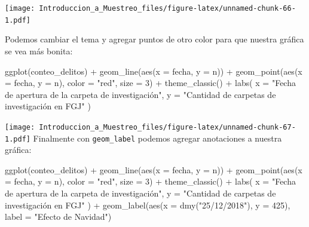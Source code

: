 \documentclass[
]{book}
\newenvironment{Shaded}{\begin{snugshade}}{\end{snugshade}}
\newcommand{\AttributeTok}[1]{\textcolor[rgb]{0.77,0.63,0.00}{#1}}
\newcommand{\DecValTok}[1]{\textcolor[rgb]{0.00,0.00,0.81}{#1}}
\newcommand{\FunctionTok}[1]{\textcolor[rgb]{0.00,0.00,0.00}{#1}}
\newcommand{\NormalTok}[1]{#1}
\newcommand{\SpecialCharTok}[1]{\textcolor[rgb]{0.00,0.00,0.00}{#1}}
\newcommand{\StringTok}[1]{\textcolor[rgb]{0.31,0.60,0.02}{#1}}
\begin{document}
\texttt{[image: Introduccion\_a\_Muestreo\_files/figure-latex/unnamed-chunk-66-1.pdf]}

Podemos cambiar el tema y agregar puntos de otro color para que nuestra gráfica se vea más bonita:

\begin{Shaded}
\begin{Highlighting}[]
\FunctionTok{ggplot}\NormalTok{(conteo\_delitos) }\SpecialCharTok{+} 
  \FunctionTok{geom\_line}\NormalTok{(}\FunctionTok{aes}\NormalTok{(}\AttributeTok{x =}\NormalTok{ fecha, }\AttributeTok{y =}\NormalTok{ n)) }\SpecialCharTok{+}
  \FunctionTok{geom\_point}\NormalTok{(}\FunctionTok{aes}\NormalTok{(}\AttributeTok{x =}\NormalTok{ fecha, }\AttributeTok{y =}\NormalTok{ n), }\AttributeTok{color =} \StringTok{"red"}\NormalTok{, }\AttributeTok{size =} \DecValTok{3}\NormalTok{) }\SpecialCharTok{+}
  \FunctionTok{theme\_classic}\NormalTok{() }\SpecialCharTok{+}
  \FunctionTok{labs}\NormalTok{(}
    \AttributeTok{x =} \StringTok{"Fecha de apertura de la carpeta de investigación"}\NormalTok{,}
    \AttributeTok{y =} \StringTok{"Cantidad de carpetas de investigación en FGJ"}
\NormalTok{  )}
\end{Highlighting}
\end{Shaded}

\texttt{[image: Introduccion\_a\_Muestreo\_files/figure-latex/unnamed-chunk-67-1.pdf]}
Finalmente con \texttt{geom\_label} podemos agregar anotaciones a nuestra gráfica:

\begin{Shaded}
\begin{Highlighting}[]
\FunctionTok{ggplot}\NormalTok{(conteo\_delitos) }\SpecialCharTok{+} 
  \FunctionTok{geom\_line}\NormalTok{(}\FunctionTok{aes}\NormalTok{(}\AttributeTok{x =}\NormalTok{ fecha, }\AttributeTok{y =}\NormalTok{ n)) }\SpecialCharTok{+}
  \FunctionTok{geom\_point}\NormalTok{(}\FunctionTok{aes}\NormalTok{(}\AttributeTok{x =}\NormalTok{ fecha, }\AttributeTok{y =}\NormalTok{ n), }\AttributeTok{color =} \StringTok{"red"}\NormalTok{, }\AttributeTok{size =} \DecValTok{3}\NormalTok{) }\SpecialCharTok{+}
  \FunctionTok{theme\_classic}\NormalTok{() }\SpecialCharTok{+}
  \FunctionTok{labs}\NormalTok{(}
    \AttributeTok{x =} \StringTok{"Fecha de apertura de la carpeta de investigación"}\NormalTok{,}
    \AttributeTok{y =} \StringTok{"Cantidad de carpetas de investigación en FGJ"}
\NormalTok{  ) }\SpecialCharTok{+}
  \FunctionTok{geom\_label}\NormalTok{(}\FunctionTok{aes}\NormalTok{(}\AttributeTok{x =} \FunctionTok{dmy}\NormalTok{(}\StringTok{"25/12/2018"}\NormalTok{), }\AttributeTok{y =} \DecValTok{425}\NormalTok{), }\AttributeTok{label =} \StringTok{"Efecto de Navidad"}\NormalTok{)}
\end{Highlighting}
\end{Shaded}
\end{document}
